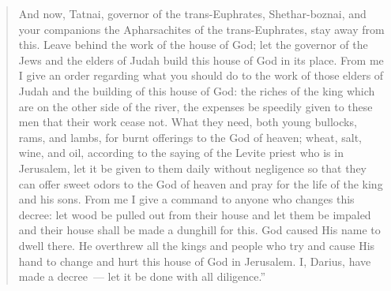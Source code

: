 \begin{quotation}
\begin{inparaenum}
         And now, Tatnai, governor of the trans-Euphrates, Shethar-boznai, and your companions the Apharsachites of the trans-Euphrates, stay away from this.%
         Leave behind the work of the house of God; let the governor of the Jews and the elders of Judah build this house of God in its place.%
         From me I give an order regarding what you should do to the work of those elders of Judah and the building of this house of God: the riches of the king which are on the other side of the river, the expenses be speedily given to these men that their work cease not.%
         What they need, both young bullocks, rams, and lambs, for burnt offerings to the God of heaven; wheat, salt, wine, and oil, according to the saying of the Levite priest who is in Jerusalem, let it be given to them daily without negligence%
         so that they can offer sweet odors to the God of heaven and pray for the life of the king and his sons.%
         From me I give a command to anyone who changes this decree: let wood be pulled out from their house and let them be impaled and their house shall be made a dunghill for this.%
         God caused His name to dwell there. He overthrew all the kings and people who try and cause His hand to change and hurt this house of God in Jerusalem. I, Darius, have made a decree~--- let it be done with all diligence.''%
    \end{inparaenum}
\end{quotation}

